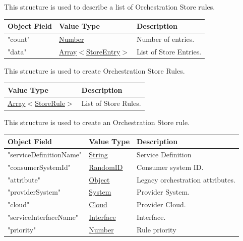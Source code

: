 \documentclass[a4paper]{arrowhead}
\newcommand{\mref}[1]{{\textcolor{ArrowheadPurple}{\hyperref[sec:model:#1]{#1}}}}
\newcommand{\pref}[1]{{\textcolor{ArrowheadGrey}{\hyperref[sec:model:primitives:#1]{#1}}}}
\begin{document}

This structure is used to describe a list of Orchestration Store rules.

\begin{table}[ht!]
\begin{tabularx}{\textwidth}{| p{5cm} | p{5cm} | X |} \hline
\rowcolor{gray!33} Object Field & Value Type      & Description \\ \hline
"count"     & \pref{Number}                        & Number of entries. \\ \hline
"data"      & \pref{Array}$<$\mref{StoreEntry}$>$  & List of Store Entries. \\ \hline

\end{tabularx}
\end{table}


This structure is used to create Orchestration Store Rules.

\begin{table}[ht!]
\begin{tabularx}{\textwidth}{| p{5cm}| X |} \hline
\rowcolor{gray!33} Value Type      & Description \\ \hline
 \pref{Array}$<$\mref{StoreRule}$>$     & List of Store Rules. \\ \hline

\end{tabularx}
\end{table}


This structure is used to create an Orchestration Store rule.

\begin{table}[ht!]
\begin{tabularx}{\textwidth}{| p{5cm} | p{5cm} | X |} \hline
\rowcolor{gray!33} Object Field & Value Type      & Description \\ \hline
"serviceDefinitionName"                 & \pref{String}            & Service Definition \\ \hline
"consumerSystemId"                      & \pref{RandomID}          & Consumer system ID. \\ \hline
"attribute"                             & \pref{Object}            & Legacy orchestration attributes. \\ \hline
"providerSystem"                        & \pref{System}            & Provider System. \\ \hline
"cloud"                                 & \pref{Cloud}             & Provider Cloud. \\ \hline
"serviceInterfaceName"                  & \pref{Interface}         & Interface. \\ \hline
"priority"                              & \pref{Number}            & Rule priority \\ \hline

\end{tabularx}
\end{table}
\end{document}
